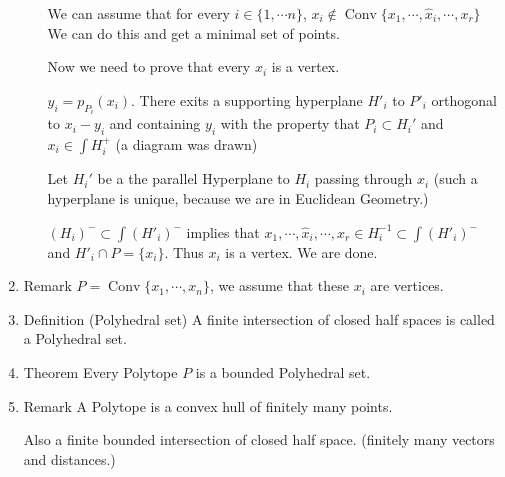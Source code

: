 \documentclass[11pt]{article}
\def\conv{\operatorname{Conv}}
\begin{document}
\begin{enumerate}
\begin{enumerate}
We can assume that for every \(i \in \{1, \cdots n\}\), \(x_i \notin \conv
      \{x_1, \cdots, \hat{x}_i, \cdots, x_r\}\) We can do this and get a minimal
set of points.

Now we need to prove that every \(x_i\) is a vertex. 

\(y_i = p_{P_i}(x_i)\). There exits a supporting hyperplane \(H'_i\) to \(P'_i\)
orthogonal to \(x_i - y_i\) and containing \(y_i\) with the property that \(P_i
      \subset H_i'\) and \(x_i \in \int H_i^{+}\) (a diagram was drawn)

Let \(H_i'\) be a the parallel Hyperplane to \(H_i\) passing through \(x_i\)
(such a hyperplane is unique, because we are in Euclidean Geometry.)

\((H_i)^{-} \subset \int (H'_i)^{-}\) implies that \(x_1, \cdots, \hat{x}_i,
      \cdots, x_r \in H_i^{-1} \subset \int (H'_i)^{-}\) and \(H'_i \cap P =
      \{x_i\}\). Thus \(x_i\) is a vertex. We are done.
\end{enumerate}
\item Remark
\label{sec:org69cbe82}
\(P = \conv \{x_1, \cdots, x_n\}\), we assume that these \(x_i\) are vertices.
\item Definition (Polyhedral set)
\label{sec:org797df0c}
A finite intersection of closed half spaces is called a Polyhedral set.
\item Theorem
\label{sec:org58282c0}
Every Polytope \(P\) is a bounded Polyhedral set.
\item Remark
\label{sec:org1cd87ce}
A Polytope is a convex hull of finitely many points.

Also a finite bounded intersection of closed half space. (finitely many
vectors and distances.)
\end{enumerate}
\end{document}
